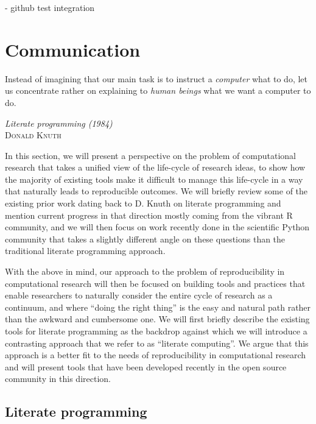 \documentclass[ChapterTOCs,krantz2]{krantz} %
\theoremstyle{definition}
\begin{document}
- github test integration



\section{\label{sec:communication}Communication}

\setlength{\epigraphrule}{0pt}
\setlength{\epigraphwidth}{.90\textwidth}
\epigraph%
{%
Instead of imagining that our main task is to instruct a \emph{computer}
what to do, let us concentrate rather on explaining to \emph{human beings}
what we want a computer to do.
}%
{\textit{Literate programming (1984)}\\ \textsc{Donald Knuth} }

In this section, we will present a perspective on the problem of
computational research that takes a unified view of the life-cycle of research
ideas, to show how the majority of existing tools make it difficult to manage
this life-cycle in a way that naturally leads to reproducible outcomes.  We
will briefly review some of the existing prior work dating back to D. Knuth on
literate programming \cite{Knuth92} and mention current progress in that
direction mostly coming from the vibrant R community, and we will then focus on
work recently done in the scientific Python community that takes a slightly
different angle on these questions than the traditional literate programming
approach.


With the above in mind, our approach to the problem of reproducibility in
computational research will then be focused on building tools and practices
that enable researchers to naturally consider the entire cycle of research as a
continuum, and where ``doing the right thing'' is the easy and natural path
rather than the awkward and cumbersome one.  We will first briefly describe the
existing tools for literate programming as the backdrop against which we will
introduce a contrasting approach that we refer to as ``literate computing''.
We argue that this approach is a better fit to the needs of reproducibility in
computational research and will present tools that have been developed recently
in the open source community in this direction.



\subsection{Literate programming}
\end{document}
